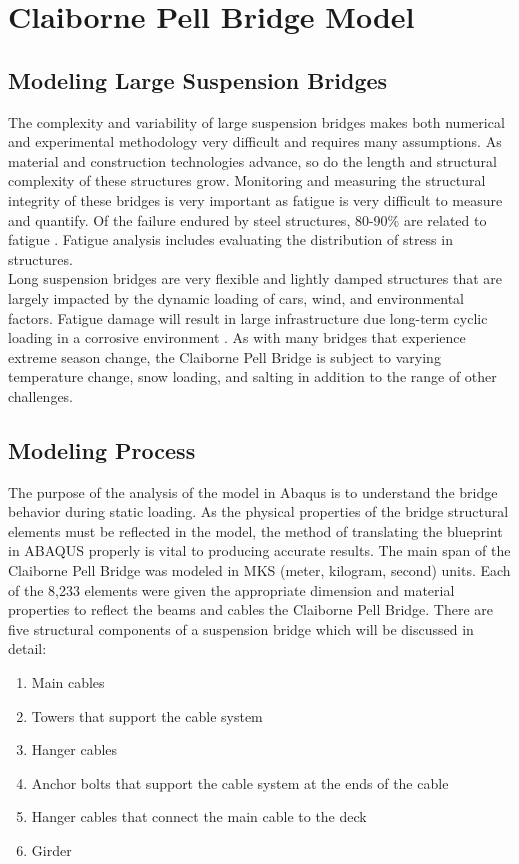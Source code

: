 \section{Claiborne Pell Bridge Model}

\subsection{Modeling Large Suspension Bridges}
The complexity and variability of large suspension bridges makes both numerical and experimental methodology very difficult and requires many assumptions.
As material and construction technologies advance, so do the length and structural complexity of these structures grow. Monitoring and measuring the
structural integrity of these bridges is very important as fatigue is very difficult to measure and quantify. Of the failure endured by steel
structures, 80-90\% are related to fatigue \cite{Chan}. Fatigue analysis includes evaluating the distribution of stress in structures.\\
\indent Long suspension bridges are very flexible and lightly damped structures that are largely impacted by the dynamic loading of cars, wind, and
environmental factors. Fatigue damage will result in large infrastructure due long-term cyclic loading in a corrosive environment
\cite{Chan}. As with many bridges that experience extreme season change, the Claiborne Pell Bridge is subject to varying temperature change,
snow loading, and salting in addition to the range of other challenges. 


\subsection{Modeling Process}

The purpose of the analysis of the model in Abaqus is to understand the bridge behavior during static loading.
As the physical properties of the bridge
structural elements must be reflected in the model, the method of translating the blueprint in ABAQUS properly is vital to producing accurate results.
The main span of the Claiborne Pell Bridge was modeled in MKS (meter, kilogram, second) units.
Each of the 8,233 elements were given the appropriate
dimension and material properties to reflect the beams and cables the Claiborne Pell Bridge. 
There are five structural components of a suspension
bridge which will be discussed in detail:

\begin{enumerate}
\item Main cables
\item Towers that support the cable system
\item Hanger cables
\item Anchor bolts that support the cable system at the ends of the cable
\item Hanger cables that connect the main cable to the deck
\item Girder
\end{enumerate}

